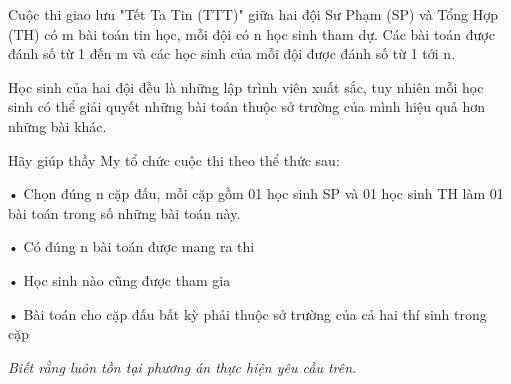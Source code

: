 Cuộc thi giao lưu "Tết Ta Tin (TTT)" giữa hai đội Sư Phạm (SP) và Tổng Hợp (TH) có m bài toán tin học, mỗi đội có n học sinh tham dự. Các bài toán được đánh số từ 1 đến m và các học sinh của mỗi đội được đánh số từ 1 tới n.   


   Học sinh của hai đội đều là những lập trình viên xuất sắc, tuy nhiên mỗi học sinh có thể giải quyết những bài toán thuộc sở trường của mình hiệu quả hơn những bài khác.   





   Hãy giúp thầy My tổ chức cuộc thi theo thể thức sau:   


   • Chọn đúng n cặp đấu, mỗi cặp gồm 01 học sinh SP và 01 học sinh TH làm 01 bài toán trong số những bài toán này.   


   • Có đúng n bài toán được mang ra thi   


   • Học sinh nào cũng được tham gia   


   • Bài toán cho cặp đấu bất kỳ phải thuộc sở trường của cả hai thí sinh trong cặp   





\textit{    Biết rằng luôn tồn tại phương án thực hiện yêu cầu trên.   }